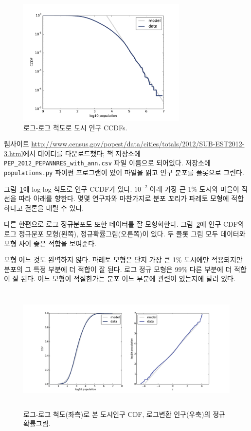 \begin{figure}
\centerline{\includegraphics[height=2.5in]{figs/populations_pareto.pdf}}
\caption{로그-로그 척도로 도시 인구 CCDFs.}
\label{populations_pareto}
\end{figure}

웹사이트 \url{http://www.census.gov/popest/data/cities/totals/2012/SUB-EST2012-3.html}에서 데이터를 다운로드했다; 책 저장소에 \verb"PEP_2012_PEPANNRES_with_ann.csv" 파일 이름으로 되어있다.
저장소에 {\tt populations.py} 파이썬 프로그램이 있어 파일을 읽고 인구 분포를 플롯으로 그린다.

그림~\ref{populations_pareto}에 log-log 척도로 인구 CCDF가 있다.
$10^{-2}$ 아래 가장 큰 1\% 도시와 마을이 직선을 따라 아래를 향한다. 몇몇 연구자와 마찬가지로 분포 꼬리가 파레토 모형에 적합하다고 결론을 내릴 수 있다.

다른 한편으로 로그 정규분포도 또한 데이터를 잘 모형화한다. 
그림~\ref{populations_normal}에 인구 CDF의 로그 정규분포 모형(왼쪽), 정규확률그림(오른쪽)이 있다. 두 플롯 그림 모두 데이터와 모형 사이 좋은 적합을 보여준다.

모형 어느 것도 완벽하지 않다. 파레토 모형은 단지 가장 큰 1\% 도시에만 적용되지만 분포의 그 특정 부분에 더 적합이 잘 된다. 
로그 정규 모형은 99\% 다른 부분에 더 적합이 잘 된다.
어느 모형이 적절한가는 분포 어느 부분에 관련이 있는지에 달려 있다.

\begin{figure}
\centerline{\includegraphics[height=2.5in]{figs/populations_normal.pdf}}
\caption{로그-로그 척도(좌측)로 본 도시인구 CDF, 로그변환 인구(우축)의 정규확률그림.}
\label{populations_normal}
\end{figure}


